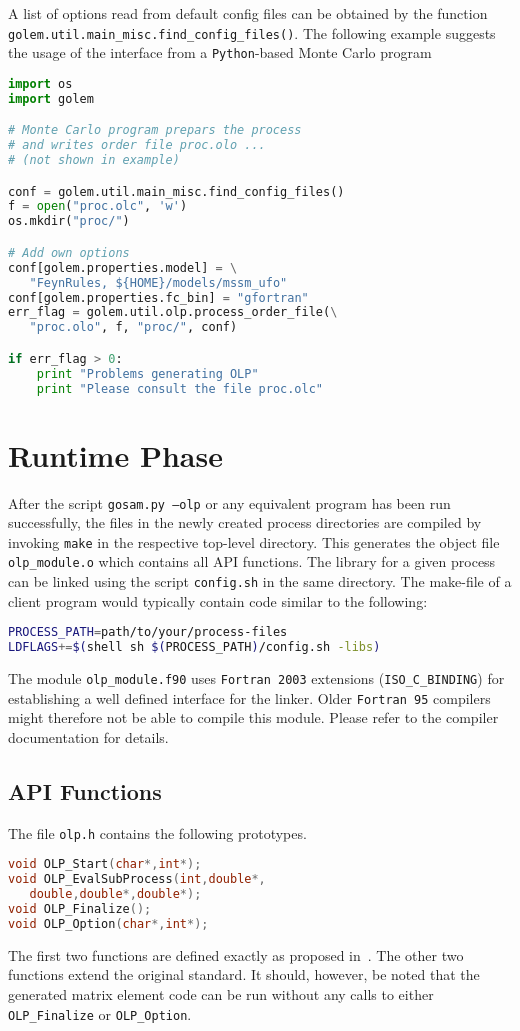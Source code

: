 \documentclass[11pt,a4paper]{refrep}
\newcommand{\python}{{\tt Python}\xspace}
\newcommand{\fortranXC}{{\tt Fortran\,95}\xspace}
\newcommand{\fortranMMIII}{{\tt Fortran\,2003}\xspace}
\begin{document}
A list of options read from default config files can be obtained by
the function
\texttt{golem.util.main\_misc.find\_config\_files()}. The following
example suggests the usage of the interface from a \python{}-based
Monte Carlo program
\begin{lstlisting}[language=python]
import os
import golem

# Monte Carlo program prepars the process
# and writes order file proc.olo ...
# (not shown in example)

conf = golem.util.main_misc.find_config_files()
f = open("proc.olc", 'w')
os.mkdir("proc/")

# Add own options
conf[golem.properties.model] = \
   "FeynRules, ${HOME}/models/mssm_ufo"
conf[golem.properties.fc_bin] = "gfortran"
err_flag = golem.util.olp.process_order_file(\
   "proc.olo", f, "proc/", conf)

if err_flag > 0:
	print "Problems generating OLP"
	print "Please consult the file proc.olc"
\end{lstlisting}


\section{Runtime Phase}

After the script \texttt{gosam.py --olp} or any equivalent program has been
run successfully, the files in the newly created process directories are
compiled by invoking \texttt{make} in the respective top-level directory.
This generates the object file \texttt{olp\_module.o} which contains all
API functions. The library for a given process can be linked using the
script \texttt{config.sh} in the same directory. The make-file of a client
program would typically contain code similar to the following:
\begin{lstlisting}[language=bash]
PROCESS_PATH=path/to/your/process-files
LDFLAGS+=$(shell sh $(PROCESS_PATH)/config.sh -libs)
\end{lstlisting}

\attention The module \texttt{olp\_module.f90} uses \fortranMMIII{}
extensions (\texttt{ISO\_C\_BINDING}) for establishing a well defined
interface for the linker. Older \fortranXC{} compilers might therefore
not be able to compile this module. Please refer to the compiler documentation
for details.

\subsection{API Functions}
\lstset{language=C}
The file \texttt{olp.h} contains the following prototypes.
\begin{lstlisting}[language=C]
void OLP_Start(char*,int*);
void OLP_EvalSubProcess(int,double*,
   double,double*,double*);
void OLP_Finalize();
void OLP_Option(char*,int*);
\end{lstlisting}
The first two functions are defined exactly as proposed
in~\cite{Binoth:2010xt}. The other two functions extend the original
standard. It should, however, be noted that the generated matrix element code
can be run without any calls to either \lstinline!OLP_Finalize!
or \lstinline!OLP_Option!.
\end{document}
